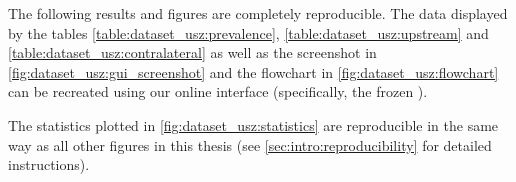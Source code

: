 \begin{tcolorbox}[
    title=\faIcon{recycle} Reproducibility,
    parbox=false,
    float
]
    The following results and figures are completely reproducible. The data displayed by the tables \cref{table:dataset_usz:prevalence}, \cref{table:dataset_usz:upstream} and \cref{table:dataset_usz:contralateral} as well as the screenshot in \cref{fig:dataset_usz:gui_screenshot} and the flowchart in \cref{fig:dataset_usz:flowchart} can be recreated using our online interface  (specifically, the frozen ).
    
    The statistics plotted in \cref{fig:dataset_usz:statistics} are reproducible in the same way as all other figures in this thesis (see \cref{sec:intro:reproducibility} for detailed instructions).
\end{tcolorbox}
